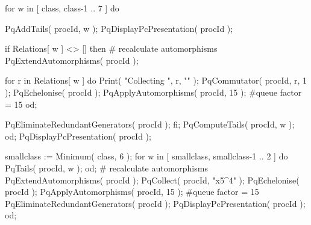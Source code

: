    for w in [ class, class-1 .. 7 ] do

        PqAddTails( procId, w );   
        PqDisplayPcPresentation( procId );

        if Relations[ w ] <> [] then
            # recalculate automorphisms
            PqExtendAutomorphisms( procId );

            for r in Relations[ w ] do
                Print( "Collecting ", r, "\n" );
                PqCommutator( procId, r, 1 );
                PqEchelonise( procId );
                PqApplyAutomorphisms( procId, 15 ); #queue factor = 15
            od;

            PqEliminateRedundantGenerators( procId );
        fi;   
        PqComputeTails( procId, w );
    od;
    PqDisplayPcPresentation( procId );

    smallclass := Minimum( class, 6 );
    for w in [ smallclass, smallclass-1 .. 2 ] do
        PqTails( procId, w );
    od;
    # recalculate automorphisms
    PqExtendAutomorphisms( procId );
    PqCollect( procId, "x5^4" );
    PqEchelonise( procId );
    PqApplyAutomorphisms( procId, 15 ); #queue factor = 15
    PqEliminateRedundantGenerators( procId );
    PqDisplayPcPresentation( procId );
od;
\endtt

